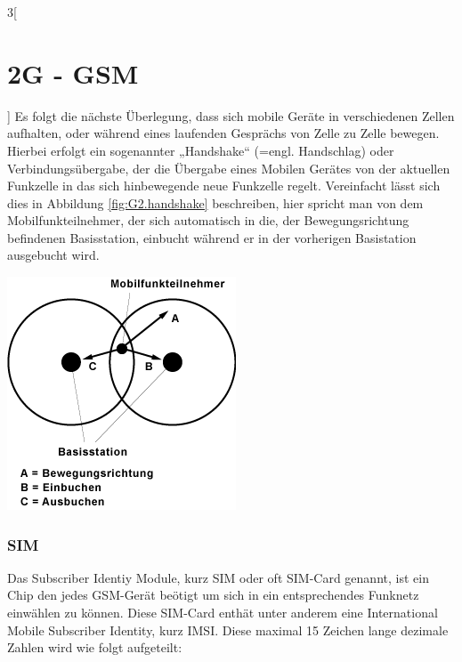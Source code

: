 \begin{multicols}{3}[\section{2G - GSM}]
Es folgt die nächste Überlegung, dass sich mobile Geräte in verschiedenen Zellen aufhalten, oder während eines laufenden Gesprächs von Zelle zu Zelle bewegen. Hierbei erfolgt ein sogenannter „Handshake“ (=engl.  Handschlag) oder Verbindungsübergabe, der die Übergabe eines Mobilen Gerätes von der aktuellen Funkzelle in das sich hinbewegende neue Funkzelle regelt.
Vereinfacht lässt sich dies in Abbildung \ref{fig:G2.handshake} beschreiben, hier spricht man von dem Mobilfunkteilnehmer, der sich automatisch in die, der Bewegungsrichtung befindenen Basisstation, einbucht während er in der vorherigen Basistation ausgebucht wird.\cite{G2.3}

\begin{Figure}
\includegraphics[width=\linewidth]{Kapitel/G2/Grafiken/GSM-Handshake.png}
\label{fig:G2.handshake}
\end{Figure}

\subsubsection*{SIM}

Das Subscriber Identiy Module, kurz SIM oder oft SIM-Card genannt, ist ein Chip den jedes GSM-Gerät beötigt um sich in ein entsprechendes Funknetz einwählen zu können. Diese SIM-Card enthät unter anderem eine International Mobile Subscriber Identity, kurz IMSI. Diese maximal 15 Zeichen lange dezimale Zahlen wird wie folgt aufgeteilt:


\end{multicols}

